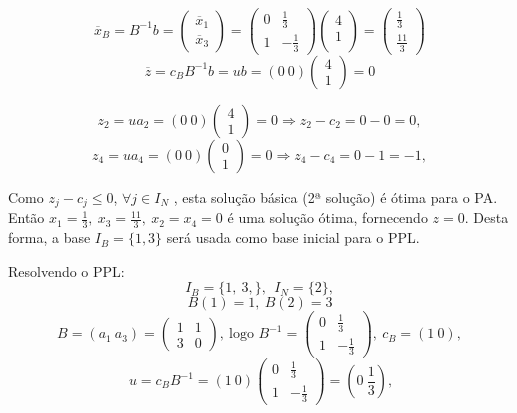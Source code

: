 \documentclass[12pt]{exam}
\begin{document}
\begin{questions}
\begin{solution}
	$$ \overline{x}_B =B^{-1}b = \begin{pmatrix}
	\overline{x}_1 \\ 
	\overline{x}_3 
	\end{pmatrix} = \begin{pmatrix}
	0 & \frac{1}{3} \\
	1 & -\frac{1}{3}
	\end{pmatrix} \begin{pmatrix}
	4 \\ 
	1 \\ 
	\end{pmatrix} = \begin{pmatrix}
	\frac{1}{3} \\ 
	\frac{11}{3} 
	\end{pmatrix}$$
	$$\overline{z} = c_BB^{-1}b = ub = (0~0) \begin{pmatrix}
	4 \\ 
	1 
	\end{pmatrix} = 0$$

	$$z_2 = ua_2 = (0~0)\begin{pmatrix}
	4 \\ 
	1 
	\end{pmatrix} = 0 \Rightarrow z_2 - c_2 = 0 - 0 =0,$$
	$$z_4 = ua_4 = (0~0)\begin{pmatrix}
	0 \\ 
	1 
	\end{pmatrix} = 0 \Rightarrow z_4 - c_4 = 0 - 1 = -1,$$

Como $z_j - c_j \leq 0$, $\forall j \in I_N$ , esta solução básica (2ª solução) é ótima para o PA. \\ 
Então $x_1 = \frac{1}{3} ,~x_3 = \frac{11}{3},~x_2 = x_4 = 0$ é uma solução ótima, fornecendo $z = 0$. Desta forma, a base $I_{B} = \{1,3\}$ será usada como base inicial para o PPL.

Resolvendo o PPL:
	$$I_B = \{1,~3,\},~~I_N = \{2\},$$
	$$B(1) = 1,~ B(2) = 3$$
	$$B = (a_1~a_3) =\begin{pmatrix}
	1 & 1 \\
	3 & 0
	\end{pmatrix},~\text{logo } B^{-1} = \begin{pmatrix}
	0 & \frac{1}{3} \\
	1 & -\frac{1}{3}
	\end{pmatrix},~c_B = (1~0),$$
	$$~u = c_BB^{-1} = (1~0)\begin{pmatrix}
	0 & \frac{1}{3} \\
	1 & -\frac{1}{3}
	\end{pmatrix} = (0~\frac{1}{3}),$$
	

\end{solution}
\end{questions}
\end{document}
